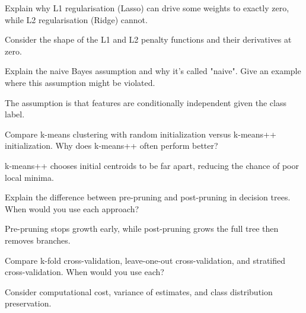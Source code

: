 \begin{exercisebox}[easy]
\begin{problem}
\label{prob:regularization-effect}
Explain why L1 regularisation (Lasso) can drive some weights to exactly zero, while L2 regularisation (Ridge) cannot.
\end{problem}
\begin{hintbox}
Consider the shape of the L1 and L2 penalty functions and their derivatives at zero.
\end{hintbox}
\end{exercisebox}


\begin{exercisebox}[easy]
\begin{problem}
\label{prob:naive-bayes}
Explain the naive Bayes assumption and why it's called "naive". Give an example where this assumption might be violated.
\end{problem}
\begin{hintbox}
The assumption is that features are conditionally independent given the class label.
\end{hintbox}
\end{exercisebox}


\begin{exercisebox}[easy]
\begin{problem}
\label{prob:kmeans-init}
Compare k-means clustering with random initialization versus k-means++ initialization. Why does k-means++ often perform better?
\end{problem}
\begin{hintbox}
k-means++ chooses initial centroids to be far apart, reducing the chance of poor local minima.
\end{hintbox}
\end{exercisebox}


\begin{exercisebox}[easy]
\begin{problem}
\label{prob:tree-pruning}
Explain the difference between pre-pruning and post-pruning in decision trees. When would you use each approach?
\end{problem}
\begin{hintbox}
Pre-pruning stops growth early, while post-pruning grows the full tree then removes branches.
\end{hintbox}
\end{exercisebox}


\begin{exercisebox}[easy]
\begin{problem}
\label{prob:cross-validation}
Compare k-fold cross-validation, leave-one-out cross-validation, and stratified cross-validation. When would you use each?
\end{problem}
\begin{hintbox}
Consider computational cost, variance of estimates, and class distribution preservation.
\end{hintbox}
\end{exercisebox}


